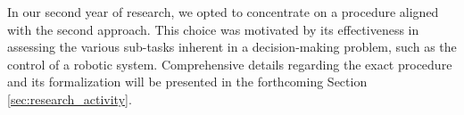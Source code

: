 In our second year of research, we opted to concentrate on a procedure aligned with the second approach. This choice was motivated by its effectiveness in assessing the various sub-tasks inherent in a decision-making problem, such as the control of a robotic system. Comprehensive details regarding the exact procedure and its formalization will be presented in the forthcoming Section \ref{sec:research_activity}.
